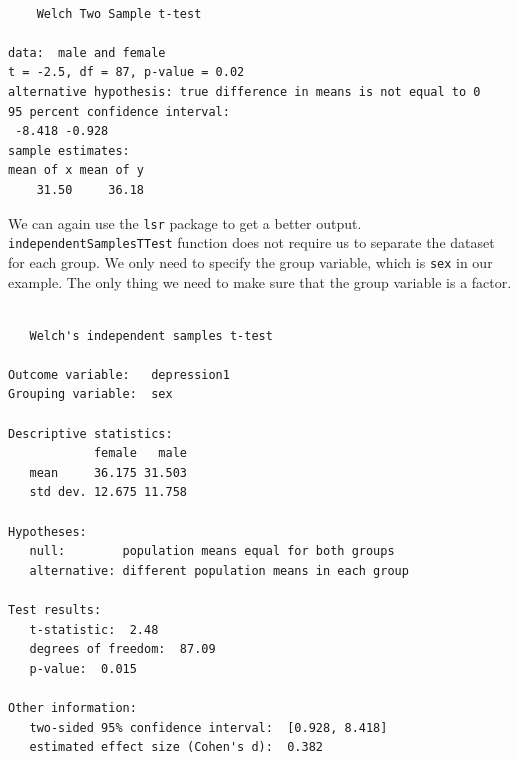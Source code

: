 \documentclass[]{book}
\newenvironment{Shaded}{\begin{snugshade}}{\end{snugshade}}
\newcommand{\DataTypeTok}[1]{\textcolor[rgb]{0.13,0.29,0.53}{#1}}
\newcommand{\FloatTok}[1]{\textcolor[rgb]{0.00,0.00,0.81}{#1}}
\newcommand{\KeywordTok}[1]{\textcolor[rgb]{0.13,0.29,0.53}{\textbf{#1}}}
\newcommand{\NormalTok}[1]{#1}
\newcommand{\OperatorTok}[1]{\textcolor[rgb]{0.81,0.36,0.00}{\textbf{#1}}}
\newcommand{\OtherTok}[1]{\textcolor[rgb]{0.56,0.35,0.01}{#1}}
\newcommand{\StringTok}[1]{\textcolor[rgb]{0.31,0.60,0.02}{#1}}
\begin{document}
\begin{verbatim}

    Welch Two Sample t-test

data:  male and female
t = -2.5, df = 87, p-value = 0.02
alternative hypothesis: true difference in means is not equal to 0
95 percent confidence interval:
 -8.418 -0.928
sample estimates:
mean of x mean of y 
    31.50     36.18 
\end{verbatim}

We can again use the \texttt{lsr} package to get a better output. \texttt{independentSamplesTTest} function does not require us to separate the dataset for each group. We only need to specify the group variable, which is \texttt{sex} in our example. The only thing we need to make sure that the group variable is a factor.

\begin{Shaded}
\end{Shaded}

\begin{verbatim}

   Welch's independent samples t-test 

Outcome variable:   depression1 
Grouping variable:  sex 

Descriptive statistics: 
            female   male
   mean     36.175 31.503
   std dev. 12.675 11.758

Hypotheses: 
   null:        population means equal for both groups
   alternative: different population means in each group

Test results: 
   t-statistic:  2.48 
   degrees of freedom:  87.09 
   p-value:  0.015 

Other information: 
   two-sided 95% confidence interval:  [0.928, 8.418] 
   estimated effect size (Cohen's d):  0.382 
\end{verbatim}
\end{document}
